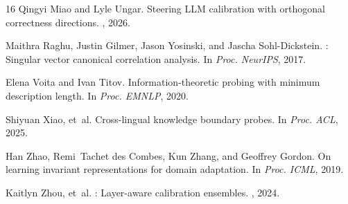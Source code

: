 \documentclass[11pt,a4paper]{article}
\begin{document}
\begin{thebibliography}{16}
Qingyi Miao and Lyle Ungar.
\newblock Steering {LLM} calibration with orthogonal correctness directions.
, 2026.

Maithra Raghu, Justin Gilmer, Jason Yosinski, and Jascha Sohl-Dickstein.
: Singular vector canonical correlation analysis.
\newblock In {\em Proc. NeurIPS}, 2017.

Elena Voita and Ivan Titov.
\newblock Information-theoretic probing with minimum description length.
\newblock In {\em Proc. EMNLP}, 2020.

Shiyuan Xiao, et~al.
\newblock Cross-lingual knowledge boundary probes.
\newblock In {\em Proc. ACL}, 2025.

Han Zhao, Remi~Tachet des Combes, Kun Zhang, and Geoffrey Gordon.
\newblock On learning invariant representations for domain adaptation.
\newblock In {\em Proc. ICML}, 2019.

Kaitlyn Zhou, et~al.
: Layer-aware calibration ensembles.
, 2024.

\end{thebibliography}
\end{document}
